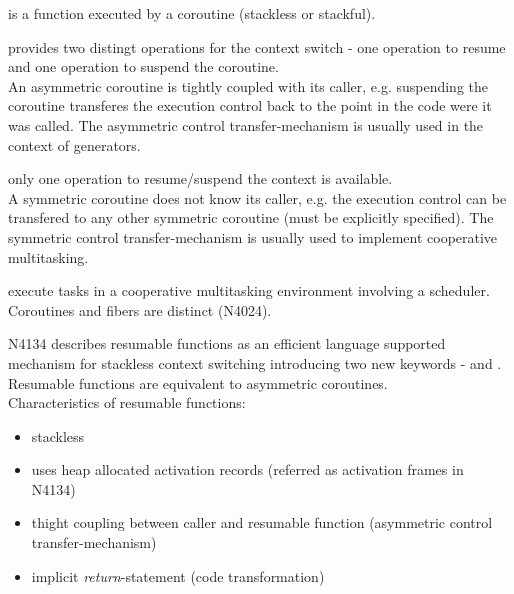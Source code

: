 is a function executed by a coroutine (stackless or stackful).

provides two distingt operations for the context switch - one operation to
resume and one operation to suspend the coroutine.\\
An asymmetric coroutine is tightly coupled with its caller, e.g. suspending the
coroutine transferes the execution control back to the point in the code were it
was called. The asymmetric control transfer-mechanism is usually used in the
context of generators.

only one operation to resume/suspend the context is available.\\
A symmetric coroutine does not know its caller, e.g. the execution control can
be transfered to any other symmetric coroutine (must be explicitly specified).
The symmetric control transfer-mechanism is usually used to implement
cooperative multitasking.

execute tasks in a cooperative multitasking environment involving a scheduler.
Coroutines and fibers are distinct (N4024\cite{N4024}).

N4134\cite{N4134} describes resumable functions as an efficient language
supported mechanism for stackless context switching introducing two new keywords
- \await and \yield. Resumable functions are equivalent to asymmetric
coroutines.\\
Characteristics of resumable functions:
\begin{itemize}
    \item stackless
    \item uses heap allocated activation records (referred as activation frames
          in N4134)
    \item thight coupling between caller and resumable function (asymmetric
          control transfer-mechanism)
    \item implicit \emph{return}-statement\cite{N4134} (code transformation)
\end{itemize}
